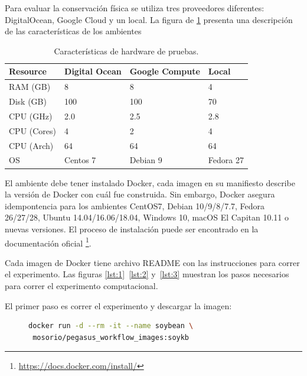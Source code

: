 Para evaluar la conservación física se utiliza tres proveedores diferentes: DigitalOcean, Google Cloud y un local. La figura de \ref{image-env} presenta una descripción de las características de los ambientes    

\begin{table}[t]
\centering
\begin{tabular}{|l|l|l|l|}
\hline
Resource   & Digital Ocean & Google Compute & Local     \\ \hline
RAM (GB)   & 8             & 8              & 4         \\ \hline
Disk (GB)  & 100           & 100            & 70        \\ \hline
CPU (GHz)  & 2.0           & 2.5            & 2.8          \\ \hline
CPU (Cores)& 4             & 2              & 4          \\ \hline
CPU (Arch) & 64            & 64             & 64        \\ \hline
OS         & Centos 7      & Debian 9       & Fedora 27 \\ \hline
\end{tabular}
\caption{Características de hardware de pruebas.}
\label{image-env}
\end{table}

El ambiente debe tener instalado Docker, cada imagen en su manifiesto describe la versión de Docker con cuál fue construida. Sin embargo, Docker asegura idempontencia para los ambientes CentOS7, Debian 10/9/8/7.7, Fedora 26/27/28, Ubuntu 14.04/16.06/18.04, Windows 10, macOS El Capitan 10.11 o nuevas versiones.
El proceso de instalación puede ser encontrado en la documentación oficial \footnote{\url{https://docs.docker.com/install/}}.

Cada imagen de Docker tiene archivo README con las instrucciones para correr el experimento. Las figuras \ref{lst:1}~\ref{lst:2} y~\ref{lst:3}  muestran los pasos necesarios para correr el experimento computacional. 

El primer paso es correr el experimento y descargar la imagen:
\begin{figure}[t]
\begin{lstlisting}[caption={Descargar y correr la imagen disponible en DockerHub mosorio/pegasus\_workflow\_images:soykb},label={lst:1},language=bash]
docker run -d --rm -it --name soybean \
 mosorio/pegasus_workflow_images:soykb
\end{lstlisting}	
\end{figure}


